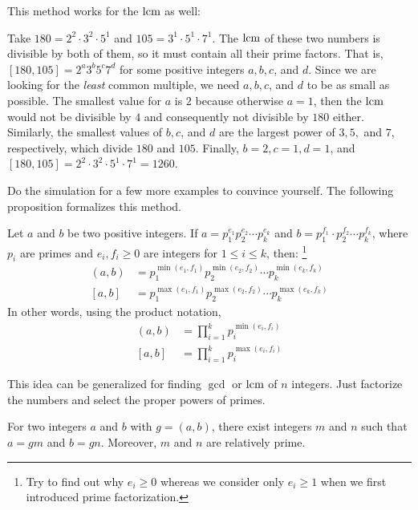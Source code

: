 This method works for the $\operatorname{lcm}$ as well:
\begin{example}
	Take $180=2^2\cdot3^2\cdot5^1$ and $105=3^1\cdot5^1\cdot7^1$. The $\operatorname{lcm}$ of these two numbers is divisible by both of them, so it must contain all their prime factors. That is, $[180, 105]=2^a3^b5^c7^d$ for some positive integers $a,b,c$, and $d$. Since we are looking for the \textit{least} common multiple, we need $a,b,c$, and $d$ to be as small as possible. The smallest value for $a$ is $2$ because otherwise $a=1$, then the $\operatorname{lcm}$ would not be divisible by $4$ and consequently not divisible by $180$ either. Similarly, the smallest values of $b,c$, and $d$ are the largest power of $3, 5,$ and $7$, respectively, which divide $180$ and $105$. Finally, $b=2, c=1, d=1$, and $[180, 105] = 2^2\cdot3^2\cdot5^1 \cdot 7^1 = 1260$.
\end{example}
Do the simulation for a few more examples to convince yourself. The following proposition formalizes this method.

\begin{proposition}\label{prop:gcdfactorization}
	Let $a$ and $b$ be two positive integers. If $a=p_1^{e_1}p_2^{e_2}\cdots p_k^{e_k}$ and $b=p_1^{f_1}\cdot p_2^{f_2}\cdots p_k^{f_k}$, where $p_i$ are primes and $e_i,f_i\geq0$ are integers for $1\leq i\leq k$, then: \footnote{Try to find out why $e_i\geq0$ whereas we consider only $e_i\geq1$ when we first introduced prime factorization.}
	\begin{align*}
		(a,b) & =p_1^{\min(e_1,f_1)}p_2^{\min(e_2,f_2)}\cdots p_k^{\min(e_k,f_k)}\\
		[a,b] &= p_1^{\max(e_1,f_1)}p_2^{ \max (e_2,f_2)}\cdots p_k^{\max(e_k,f_k)}
	\end{align*}
	In other words, using  the product notation,
	\begin{align*}
		(a,b) & =\prod_{i=1}^kp_i^{\min(e_i,f_i)}\\
		[a,b] & =\prod_{i=1}^kp_i^{\max(e_i,f_i)}
	\end{align*}
\end{proposition}

\begin{note}
	This idea can be generalized for finding $\gcd$ or $\operatorname{lcm}$ of $n$ integers. Just factorize the numbers and select the proper powers of primes.
\end{note}
\begin{proposition}\label{prop:gcduncommon}
	For two integers $a$ and $b$ with $g=(a,b)$, there exist integers $m$ and $n$ such that $a=gm$ and $b=gn$. Moreover, $m$ and $n$ are relatively prime.
\end{proposition}


